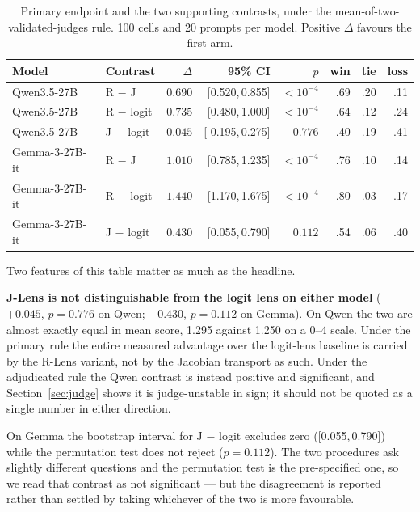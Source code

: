 \documentclass[11pt]{article}
\newcommand{\ci}[2]{[#1,\,#2]}
\begin{document}
\begin{table}[h]
\centering
\small
\begin{tabular}{llrrrrrr}
\toprule
Model & Contrast & $\Delta$ & 95\% CI & $p$ & win & tie & loss \\
\midrule
Qwen3.5-27B & R $-$ J        & $0.690$ & \ci{0.520}{0.855} & $<10^{-4}$ & .69 & .20 & .11 \\
Qwen3.5-27B & R $-$ logit    & $0.735$ & \ci{0.480}{1.000} & $<10^{-4}$ & .64 & .12 & .24 \\
Qwen3.5-27B & J $-$ logit    & $0.045$ & \ci{-0.195}{0.275} & $0.776$   & .40 & .19 & .41 \\
\addlinespace
Gemma-3-27B-it & R $-$ J     & $1.010$ & \ci{0.785}{1.235} & $<10^{-4}$ & .76 & .10 & .14 \\
Gemma-3-27B-it & R $-$ logit & $1.440$ & \ci{1.170}{1.675} & $<10^{-4}$ & .80 & .03 & .17 \\
Gemma-3-27B-it & J $-$ logit & $0.430$ & \ci{0.055}{0.790} & $0.112$    & .54 & .06 & .40 \\
\bottomrule
\end{tabular}
\caption{Primary endpoint and the two supporting contrasts, under the
mean-of-two-validated-judges rule. 100 cells and 20 prompts per model. Positive
$\Delta$ favours the first arm.}
\label{tab:primary}
\end{table}

Two features of this table matter as much as the headline.

\textbf{J-Lens is not distinguishable from the logit lens on either model}
($+0.045$, $p = 0.776$ on Qwen; $+0.430$, $p = 0.112$ on Gemma). On Qwen the two
are almost exactly equal in mean score, 1.295 against 1.250 on a 0--4 scale.
Under the primary rule the entire measured advantage over the logit-lens
baseline is carried by the R-Lens variant, not by the Jacobian transport as
such. Under the adjudicated rule the Qwen contrast is instead positive and
significant, and Section~\ref{sec:judge} shows it is judge-unstable in sign; it
should not be quoted as a single number in either direction.

On Gemma the bootstrap interval for J $-$ logit excludes zero (\ci{0.055}{0.790})
while the permutation test does not reject ($p = 0.112$). The two procedures ask
slightly different questions and the permutation test is the pre-specified one,
so we read that contrast as not significant --- but the disagreement is reported
rather than settled by taking whichever of the two is more favourable.
\end{document}
